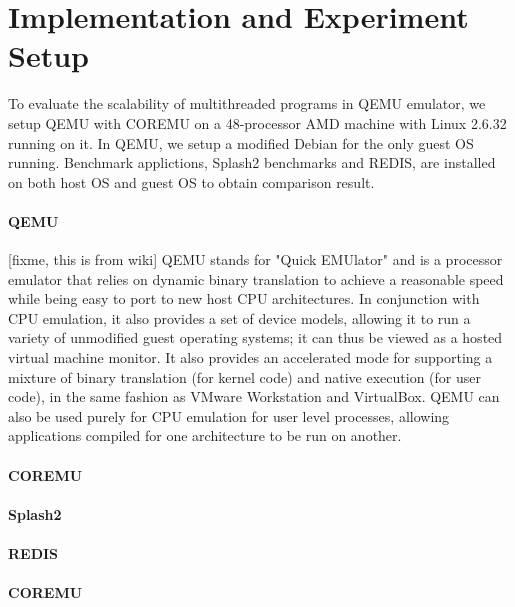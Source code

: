 \section{Implementation and Experiment Setup}

To evaluate the scalability of multithreaded programs in QEMU emulator, we 
setup QEMU with COREMU on a 48-processor AMD machine with Linux 2.6.32 running
on it. In QEMU, we setup a modified Debian for the only guest OS running. 
Benchmark applictions, Splash2 benchmarks and REDIS, are installed on both 
host OS and guest OS to obtain comparison result. 

\paragraph{QEMU} [fixme, this is from wiki]
QEMU stands for "Quick EMUlator" and is a processor emulator that relies on dynamic binary translation to achieve a reasonable speed while being easy to port to new host CPU architectures.
In conjunction with CPU emulation, it also provides a set of device models, allowing it to run a variety of unmodified guest operating systems; it can thus be viewed as a hosted virtual machine monitor. It also provides an accelerated mode for supporting a mixture of binary translation (for kernel code) and native execution (for user code), in the same fashion as VMware Workstation and VirtualBox. QEMU can also be used purely for CPU emulation for user level processes, allowing applications compiled for one architecture to be run on another.

\paragraph{COREMU}

\paragraph{Splash2}
\paragraph{REDIS}
\paragraph{COREMU}
